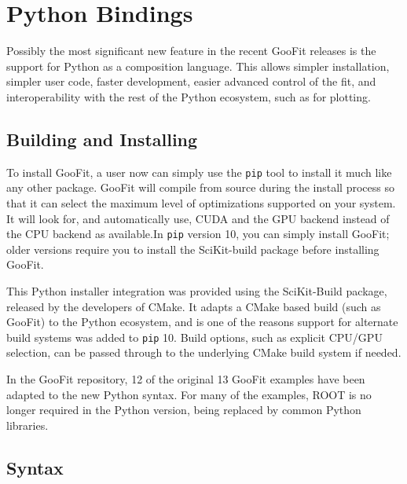 \documentclass{webofc}
\begin{document}
\section{Python Bindings}
\label{sec-py}

Possibly the most significant new feature in the recent GooFit releases is the support for Python as a composition language. This allows simpler installation, simpler user code, faster development, easier advanced control of the fit, and interoperability with the rest of the Python ecosystem, such as for plotting.

\subsection{Building and Installing}

To install GooFit, a user now can simply use the \texttt{pip} tool to install it much like any other package. GooFit will compile from source during the install process so that it can select the maximum level of optimizations supported on your system. It will look for, and automatically use, CUDA and the GPU backend instead of the CPU backend as available.In \texttt{pip} version 10, you can simply install GooFit; older versions require you to install the SciKit-build package before installing GooFit.

This Python installer integration was provided using the SciKit-Build package, released by the developers of CMake. It adapts a CMake based build (such as GooFit) to the Python ecosystem, and is one of the reasons support for alternate build systems was added to \texttt{pip} 10. Build options, such as explicit CPU/GPU selection, can be passed through to the underlying CMake build system if needed.

In the GooFit repository, 12 of the original 13 GooFit examples have been  adapted to the new Python syntax. For many of the examples, ROOT is no longer required in the Python version, being replaced by common Python libraries.

\subsection{Syntax}
\end{document}
